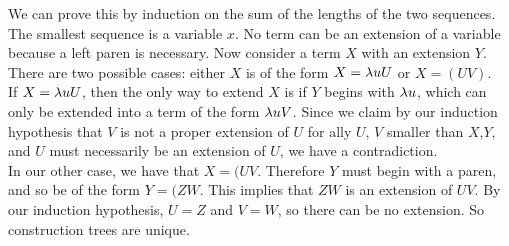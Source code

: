 We can prove this by induction on the sum of the lengths of the two sequences. The smallest sequence is a variable $x$. No term can be an extension of a variable because a left paren is necessary. Now consider a term $X$ with an extension $Y$. There are two possible cases: either $X$ is of the form $X = \lambda uU$ or $X = (UV)$.\\

If $X = \lambda uU$, then the only way to extend $X$ is if $Y$ begins with $\lambda u$, which can only be extended into a term of the form $\lambda uV$. Since we claim by our induction hypothesis that $V$ is not a proper extension of $U$ for ally $U$, $V$ smaller than $X$,$Y$, and $U$ must necessarily be an extension of $U$, we have a contradiction.\\

In our other case, we have that $X = (UV$. Therefore $Y$ must begin with a paren, and so be of the form $Y = (ZW$. This implies that $ZW$ is an extension of $UV$. By our induction hypothesis, $U = Z$ and $V = W$, so there can be no extension. So construction trees are unique.